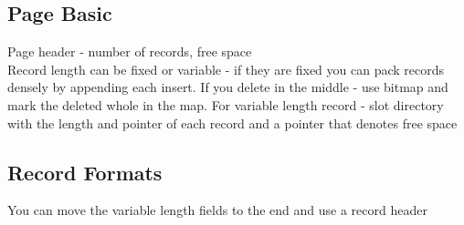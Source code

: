 \documentclass{article}
\begin{document}
\subsection{Page Basic}
Page header - number of records, free space \\
Record length can be fixed or variable - if they are fixed you can pack records densely by appending each insert. If you delete in the middle - use bitmap and mark the deleted whole in the map. For variable length record - slot directory with the length and pointer of each record and a pointer that denotes free space
\subsection{Record Formats}
You can move the variable length fields to the end and use a record header
\end{document}
